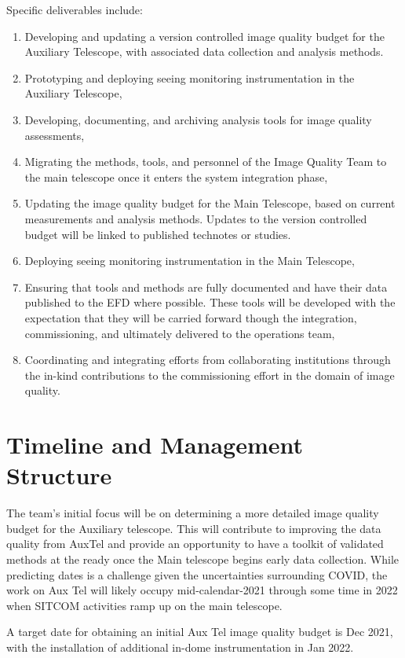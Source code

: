 \documentclass[SE,authoryear,toc]{lsstdoc}
\begin{document}
Specific deliverables include:
\begin{enumerate}
\item Developing and updating a version controlled image quality budget for the Auxiliary Telescope, with associated data collection and analysis methods.
\item Prototyping and deploying seeing monitoring instrumentation in the Auxiliary Telescope,
\item Developing, documenting, and archiving analysis tools for image quality assessments,
\item Migrating the methods, tools, and personnel of the Image Quality Team to the main telescope once it enters the system integration phase,
\item Updating the image quality budget for the Main Telescope, based on current measurements and analysis methods.
    Updates to the version controlled budget will be linked to published technotes or studies.
\item Deploying seeing monitoring instrumentation in the Main Telescope,
\item Ensuring that tools and methods are fully documented and have their data published to the EFD where possible.
    These tools will be developed with the expectation that they will be carried forward though the integration, commissioning, and ultimately delivered to the operations team,
\item Coordinating and integrating efforts from collaborating institutions through the in-kind contributions to the commissioning effort in the domain of image quality.
\end{enumerate}

\section{Timeline and Management Structure}

The team's initial focus will be on determining a more detailed image quality budget for the Auxiliary telescope.
This will contribute to improving the data quality from AuxTel and provide an opportunity to have a toolkit of validated methods at the ready once the Main telescope begins early data collection.
While predicting dates is a challenge given the uncertainties surrounding COVID, the work on Aux Tel will likely occupy mid-calendar-2021 through some time in 2022 when SITCOM activities ramp up on the main telescope.

A target date for obtaining an initial Aux Tel image quality budget is Dec 2021, with the installation of additional in-dome instrumentation in Jan 2022.
\end{document}
